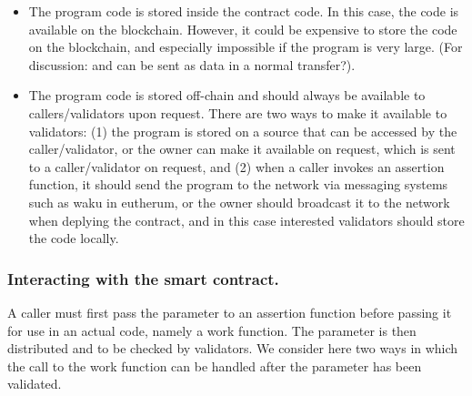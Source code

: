 \documentclass[runningheads]{llncs}
\begin{document}
\begin{itemize} 
\item The program code is stored inside the contract code. In this case, the code is available on the blockchain. However, it could be expensive to store the code on the blockchain, and especially impossible if the program is very large. (For discussion: and can be sent as data in a normal transfer?). 
\item The program code is stored off-chain and should always be available to callers/validators upon request. There are two ways to make it available to validators: (1) the program is stored on a source that can be accessed by the caller/validator, or the owner can make it available on request, which is sent to a caller/validator on request, and (2) when a caller invokes an assertion function, it should send the program to the network via messaging systems such as waku in eutherum, or the owner should broadcast it to the network when deplying the contract, and in this case interested validators should store the code locally. \end{itemize}



\subsubsection{Interacting with the smart contract.}
A caller must first pass the parameter to an assertion function before passing it for use in an actual code, namely a work function. The parameter is then distributed and to be checked by validators. We consider here two ways in which the call to the work function can be handled after the parameter has been validated.
\end{document}
